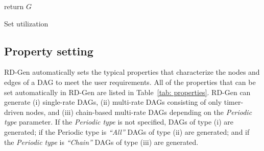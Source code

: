 \begin{algorithm}[t]
    {\footnotesize
        return $G$
        \caption{Set utilization}
        \label{alg: set_utilization}
    }
\end{algorithm}


\subsection{Property setting}
\label{ssec: set_properties}

RD-Gen automatically sets the typical properties that characterize the nodes and edges of a DAG to meet the user requirements. All of the properties that can be set automatically in RD-Gen are listed in Table~\ref{tab: properties}.
RD-Gen can generate (i) single-rate DAGs, (ii) multi-rate DAGs consisting of only timer-driven nodes, and (iii) chain-based multi-rate DAGs depending on the {\it Periodic type} parameter.
If the {\it Periodic type} is not specified, DAGs of type (i) are generated; if the Periodic type is {\it “All”} DAGs of type (ii) are generated; and if the {\it Periodic type} is {\it “Chain”} DAGs of type (iii) are generated.

